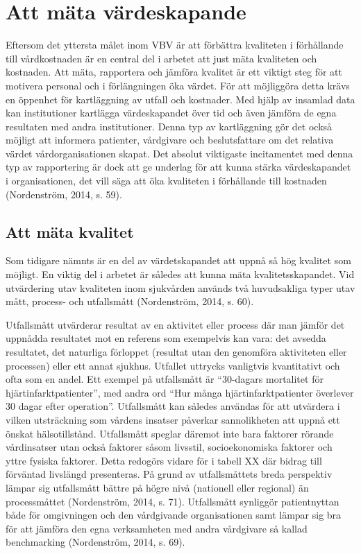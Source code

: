 \section{Att mäta värdeskapande}

Eftersom det yttersta målet inom VBV är att förbättra kvaliteten i förhållande till vårdkostnaden är en central del i arbetet att just mäta kvaliteten och kostnaden. Att mäta, rapportera och jämföra kvalitet är ett viktigt steg för att motivera personal och i förlängningen öka värdet. För att möjliggöra detta krävs en öppenhet för kartläggning av utfall och kostnader. Med hjälp av insamlad data kan institutioner kartlägga värdeskapandet över tid och även jämföra de egna resultaten med andra institutioner. Denna typ av kartläggning gör det också möjligt att informera patienter, vårdgivare och beslutsfattare om det relativa värdet vårdorganisationen skapat. Det absolut viktigaste incitamentet med denna typ av rapportering är dock att ge underlag för att kunna stärka värdeskapandet i organisationen, det vill säga att öka kvaliteten i förhållande till kostnaden (Nordenström, 2014, s. 59).

\subsection{Att mäta kvalitet}

Som tidigare nämnts är en del av värdetskapandet att uppnå så hög kvalitet som möjligt. En viktig del i arbetet är således att kunna mäta kvalitetsskapandet. Vid utvärdering utav kvaliteten inom sjukvården används två huvudsakliga typer utav mått, process- och utfallsmått (Nordenström, 2014, s. 60).
 
Utfallsmått utvärderar resultat av en aktivitet eller process där man jämför det uppnådda resultatet mot en referens som exempelvis kan vara: det avsedda resultatet, det naturliga förloppet (resultat utan den genomföra aktiviteten eller processen) eller ett annat sjukhus. Utfallet uttrycks vanligtvis kvantitativt och ofta som en andel. Ett exempel på utfallsmått är “30-dagars mortalitet för hjärtinfarktpatienter”, med andra ord “Hur många hjärtinfarktpatienter överlever 30 dagar efter operation”. Utfallsmått kan således användas för att utvärdera i vilken utsträckning som vårdens insatser påverkar sannolikheten att uppnå ett önskat hälsotillstånd. Utfallsmått speglar däremot inte bara faktorer rörande vårdinsatser utan också faktorer såsom livsstil, socioekonomiska faktorer och yttre fysiska faktorer. Detta redogörs vidare för i tabell XX där bidrag till förväntad livslängd presenteras. På grund av utfallsmåttets breda perspektiv lämpar sig utfallsmått bättre på högre nivå (nationell eller regional) än processmåttet (Nordenström, 2014, s. 71). Utfallsmått synliggör patientnyttan både för omgivningen och den vårdgivande organisationen samt lämpar sig bra för att jämföra den egna verksamheten med andra vårdgivare så kallad benchmarking (Nordenström, 2014, s. 69).
 
